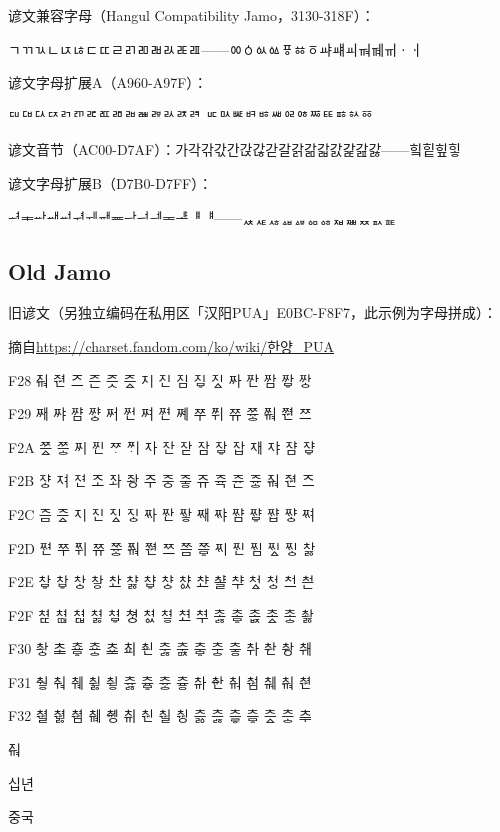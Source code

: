 谚文兼容字母（Hangul Compatibility Jamo，3130-318F）：\* 

{\oldjamo ㄱㄲㄳㄴㄵㄶㄷㄸㄹㄺㄻㄼㄽㄾㄿ——ㆀㆁㆂㆃㆄㆅㆆㆇㆈㆉㆊㆋㆌㆍㆎ }\*

谚文字母扩展A（A960-A97F）：

{\oldjamo ꥠꥡꥢꥣꥤꥥꥦꥧꥨꥩꥪꥫꥬꥭꥮ
ꥰꥱꥲꥳꥴꥵꥶꥷꥸꥹꥺꥻꥼ}

谚文音节（AC00-D7AF）：가각갂갃간갅갆갇갈갉갊갋갌갍갎갏——힠힡힢힣\*

谚文字母扩展B（D7B0-D7FF）：

{\oldjamo ힰힱힲힳힴힵힶힷힸힹힺힻힼힽힾힿ——ퟰퟱퟲퟳퟴퟵퟶퟷퟸퟹퟺퟻ}

\subsection{Old Jamo}

旧谚文（另独立编码在私用区「汉阳PUA」E0BC-F8F7，此示例为字母拼成）：

摘自\href{https://charset.fandom.com/ko/wiki/한양_PUA}{https://charset.fandom.com/ko/wiki/한양\_PUA}

{
    \oldjamo
F28 ᅎᆑ	ᅎᆑᆫ	ᅎᅳ	ᅎᅳᆫ	ᅎᅳᆺ	ᅎᅳᇫ	ᅎᅵ	ᅎᅵᆫ	ᅎᅵᆷ	ᅎᅵᇢ	ᅎᅵᇫ	ᅏᅡ	ᅏᅡᆫ	ᅏᅡᆷ	ᅏᅡᇢ	ᅏᅡᇰ

F29	ᅏᅢ	ᅏᅣ	ᅏᅣᆷ	ᅏᅣᇰ	ᅏᅥ	ᅏᅥᆫ	ᅏᅧ	ᅏᅧᆫ	ᅏᅨ	ᅏᅮ	ᅏᅱ	ᅏᅲ	ᅏᅲᇰ	ᅏᆑ	ᅏᆑᆫ	ᅏᅳ

F2A	ᅏᅳᇫ	ᅏᅳᇰ	ᅏᅵ	ᅏᅵᆫ	ᅏᆞ	ᅏᆡ	ᅐᅡ	ᅐᅡᆫ	ᅐᅡᆮ	ᅐᅡᆷ	ᅐᅡᇢ	ᅐᅡᆸ	ᅐᅢ	ᅐᅣ	ᅐᅣᆷ	ᅐᅣᇢ

F2B	ᅐᅣᇰ	ᅐᅧ	ᅐᅧᆫ	ᅐᅩ	ᅐᅪ	ᅐᅪᆼ	ᅐᅮ	ᅐᅮᆼ	ᅐᅮᇹ	ᅐᅲ	ᅐᅲᆨ	ᅐᅲᆫ	ᅐᅲᇰ	ᅐᆑ	ᅐᆑᆫ	ᅐᅳ

F2C	ᅐᅳᆷ	ᅐᅳᇫ	ᅐᅵ	ᅐᅵᆫ	ᅐᅵᇫ	ᅐᅵᇰ	ᅑᅡ	ᅑᅡᆫ	ᅑᅡᇂ	ᅑᅢ	ᅑᅣ	ᅑᅣᆷ	ᅑᅣᇢ	ᅑᅣᆸ	ᅑᅣᇰ	ᅑᅧ

F2D	ᅑᅧᆫ	ᅑᅮ	ᅑᅱ	ᅑᅲ	ᅑᅲᇰ	ᅑᆑ	ᅑᆑᆫ	ᅑᅳ	ᅑᅳᆷ	ᅑᅳᇢ	ᅑᅵ	ᅑᅵᆫ	ᅑᅵᆷ	ᅑᅵᇫ	ᅑᅵᇰ	차ᇙ

F2E	차ᇢ	차ᇦ	차ᇰ	차ᇹ	ᄎᅶ	챠ᇙ	챠ᇦ	챠ᇰ	챠ᇱ	ᄎᅸ	ᄎᅸᆯ	ᄎᆤ	처ᇫ	처ᇰ	ᄎᅼ	ᄎᅼᆫ

F2F	쳐ퟍ	쳐ퟎ	쳐ퟏ	쳐ᇙ	쳐ᇢ	쳐ᇰ	쳐ᇱ	쳐ᇹ	ᄎᅽ	ᄎᅾ	초ᇙ	초ᇢ	초ퟨ	초ᇫ	초ᇰ	촤ᇙ

F30	촤ᇰ	ᄎᆂ	쵸ᇢ	쵸ᇰ	ᄎᆇ	ᄎᆈ	ᄎᆈᆫ	추ᇙ	추ᇠ	추ᇢ	추ᇰ	추ᇹ	ᄎᆉ	ᄎᆉᆫ	ᄎᆉᆼ	ᄎᆊ

F31	춰ᇹ	ᄎힵ	ᄎᆌ	취ᇙ	취ᇹ	츄ᇙ	츄ᇢ	츄ᇰ	츄ᇹ	ᄎᆎ	ᄎᆎᆫ	ᄎᆏ	ᄎᆏᆷ	ᄎᆐ	ᄎᆑ	ᄎᆑᆫ

F32	ᄎᆑᆯ	ᄎᆑᇙ	ᄎᆑᆷ	ᄎᆒ	ᄎᆒᆼ	ᄎᆔ	ᄎᆔᆫ	ᄎᆔᆯ	ᄎᆔᆼ	츠ퟛ	츠ᇙ	츠ퟝ	츠ᇢ	츠ᇫ	츠ᇰ	ᄎᆕ
}

ᅎᆑ %

십년 %

중국 %

